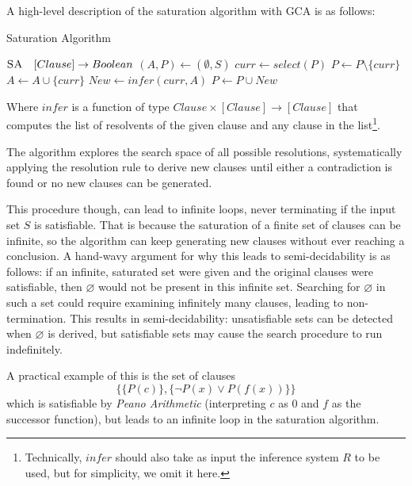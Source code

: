 A high-level description of the saturation algorithm with GCA is as follows:
\begin{algorithm}[H]
    \caption{Saturation Algorithm}\label{alg:saturation-algorithm}
    \begin{algorithmic}[1]
        \Statex{}  \(\textsc{SA} \quad [Clause] \to Boolean\)
            \State{} \((A,P)\gets (\emptyset,S)\)
                \State{} \(curr \gets select(P)\)
                \State{} \(P \gets P \setminus \{curr\}\)
                \State{} \(A \gets A \cup \{curr\}\)
                \State{} \(New \gets infer(curr, A)\)
                    \State{}  
                \EndIf{}
                \State{} \(P \gets P \cup New\)
            \EndWhile{}
            \State{} 
        \EndFunction{}
    \end{algorithmic}
\end{algorithm}

Where \(infer\) is a function of type \(Clause \times [Clause] \to [Clause]\) that computes the list of resolvents of the given clause and any clause in the list\footnote{
  Technically, \(infer\) should also take as input the inference system \(R\) to be used, but for simplicity, we omit it here.
}.

The algorithm explores the search space of all possible resolutions, systematically applying the resolution rule to derive new clauses until either a contradiction is found or no new clauses can be generated.

This procedure though, can lead to infinite loops, never terminating if the input set \(S\) is satisfiable.
That is because the saturation of a finite set of clauses can be infinite, so the algorithm can keep generating new clauses without ever reaching a conclusion.
A hand-wavy argument for why this leads to semi-decidability is as follows: if an infinite, saturated set were given and the original clauses were satisfiable, then \(\varnothing\) would not be present in this infinite set.
Searching for \(\varnothing\) in such a set could require examining infinitely many clauses, leading to non-termination.
This results in semi-decidability: unsatisfiable sets can be detected when \(\varnothing\) is derived, but satisfiable sets may cause the search procedure to run indefinitely.

A practical example of this is the set of clauses
\begin{equation}\label{eq:non_terminating}
  \{ \{P(c)\}, \{\neg P(x) \lor P(f(x))\} \}
\end{equation}
which is satisfiable by \emph{Peano Arithmetic} (interpreting \(c\) as \(0\) and \(f\) as the successor function), but leads to an infinite loop in the saturation algorithm.


